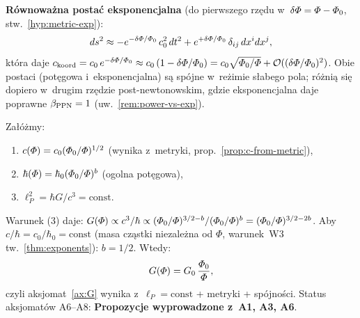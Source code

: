 \begin{proposition}
\medskip\noindent
\textbf{R\'ownowa\.zna posta\'c eksponencjalna} (do pierwszego rz\k{e}du
w~$\delta\varPhi = \varPhi - \varPhi_0$, stw.~\ref{hyp:metric-exp}):
\begin{equation}
  ds^2 \approx -e^{-\delta\varPhi/\varPhi_0}\,c_0^2\,dt^2
         + e^{+\delta\varPhi/\varPhi_0}\,\delta_{ij}\,dx^i dx^j,
\end{equation}
kt\'ora daje $c_{\rm koord} = c_0\,e^{-\delta\varPhi/\varPhi_0}
\approx c_0\,(1 - \delta\varPhi/\varPhi_0) = c_0\sqrt{\varPhi_0/\varPhi}
+ \mathcal{O}((\delta\varPhi/\varPhi_0)^2)$.
Obie postaci (pot\k{e}gowa i~eksponencjalna) s\k{a} sp\'ojne
w~re\.zimie s\l{}abego pola; r\'o\.zni\k{a} si\k{e} dopiero
w~drugim rz\k{e}dzie post-newtonowskim, gdzie eksponencjalna
daje poprawne $\beta_{\rm PPN} = 1$
(uw.~\ref{rem:power-vs-exp}).
\end{proposition}

\begin{proposition}\label{prop:G-from-lP}
Za\l{}\'o\.zmy:
\begin{enumerate}[nosep]
  \item $c(\varPhi) = c_0(\varPhi_0/\varPhi)^{1/2}$ (wynika z~metryki, prop.~\ref{prop:c-from-metric}),
  \item $\hbar(\varPhi) = \hbar_0(\varPhi_0/\varPhi)^{b}$ (ogolna pot\k{e}gowa),
  \item $\ell_P^2 = \hbar G/c^3 = \mathrm{const}$.
\end{enumerate}
Warunek (3) daje: $G(\varPhi) \propto c^3/\hbar \propto (\varPhi_0/\varPhi)^{3/2 - b}/(\varPhi_0/\varPhi)^b
= (\varPhi_0/\varPhi)^{3/2 - 2b}$.
Aby $c/\hbar = c_0/\hbar_0 = \mathrm{const}$ (masa cz\k{a}stki niezale\.zna od $\Phi$,
warunek~W3 tw.~\ref{thm:exponents}): $b = 1/2$. Wtedy:
\begin{equation}
  G(\varPhi) = G_0\,\frac{\varPhi_0}{\varPhi},
\end{equation}
czyli aksjomat~\ref{ax:G} wynika z~$\ell_P = \mathrm{const}$ + metryki + sp\'ojno\'sci.
Status aksjomat\'ow A6--A8: \textbf{Propozycje wyprowadzone z~A1, A3, A6}.
\end{proposition}

